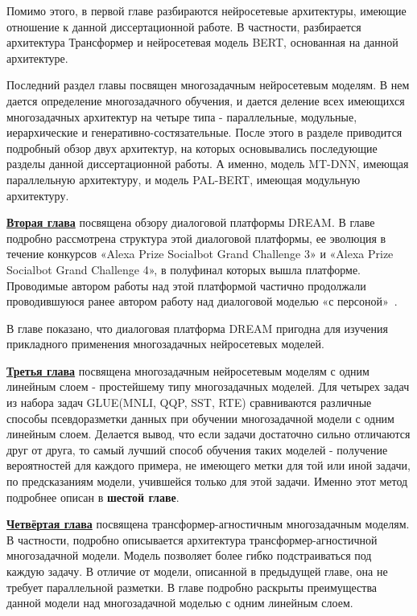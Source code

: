 Помимо этого, в первой главе разбираются нейросетевые архитектуры, имеющие отношение к данной диссертационной работе. В частности, разбирается архитектура Трансформер и нейросетевая модель {BERT}, основанная на данной архитектуре. 

Последний раздел главы посвящен многозадачным нейросетевым моделям. В нем дается определение многозадачного обучения, и дается деление всех имеющихся многозадачных архитектур на четыре типа - параллельные, модульные, иерархические и генеративно-состязательные. После этого в разделе приводится подробный обзор двух архитектур, на которых основывались последующие разделы данной диссертационной работы. А именно, модель {MT-DNN}, имеющая параллельную архитектуру, и модель {PAL-BERT}, имеющая модульную архитектуру. 

\underline{\textbf{Вторая глава}} посвящена обзору диалоговой платформы DREAM. В главе подробно рассмотрена структура этой диалоговой платформы, ее эволюция в течение конкурсов «Alexa Prize Socialbot Grand Challenge 3» и «Alexa Prize Socialbot Grand Challenge 4», в полуфинал которых вышла платформе.  Проводимые автором работы над этой платформой частично продолжали проводившуюся ранее автором работу над диалоговой моделью «с персоной»~\cite{Болотин_Карпов_Рашков_Шкурак_2019}.

В главе показано, что диалоговая платформа DREAM пригодна для изучения прикладного применения многозадачных нейросетевых моделей.

\underline{\textbf{Третья глава}} посвящена многозадачным нейросетевым моделям с одним линейным слоем - простейшему типу многозадачных моделей. Для четырех задач из набора задач GLUE(MNLI, QQP, SST, RTE) сравниваются различные способы псевдоразметки данных при обучении многозадачной модели с одним линейным слоем. Делается вывод, что если задачи достаточно сильно отличаются друг от друга, то самый лучший способ обучения таких моделей - получение вероятностей для каждого примера, не имеющего метки для той или иной задачи, по предсказаниям модели, учившейся только для этой задачи. Именно этот метод подробнее описан в \textbf{шестой главе}.

\underline{\textbf{Четвёртая глава}} посвящена трансформер-агностичным многозадачным моделям. В частности, подробно описывается архитектура трансформер-агностичной многозадачной модели. Модель позволяет более гибко подстраиваться под каждую задачу. В отличие от модели, описанной в предыдущей главе, она не требует параллельной разметки. В главе подробно раскрыты преимущества данной модели над многозадачной моделью с одним линейным слоем.

